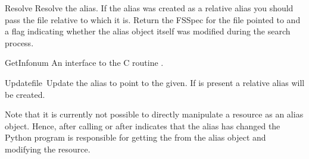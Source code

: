 \begin{funcdesc}{Resolve}{}
Resolve the alias. If the alias was created as a relative alias you
should pass the file relative to which it is. Return the FSSpec for
the file pointed to and a flag indicating whether the alias object
itself was modified during the search process. 
\end{funcdesc}

\begin{funcdesc}{GetInfo}{num}
An interface to the C routine .
\end{funcdesc}

\begin{funcdesc}{Update}{file\, }
Update the alias to point to the  given. If  is
present a relative alias will be created.
\end{funcdesc}

Note that it is currently not possible to directly manipulate a resource
as an alias object. Hence, after calling  or after
 indicates that the alias has changed the Python program
is responsible for getting the  from the alias object and
modifying the resource.


